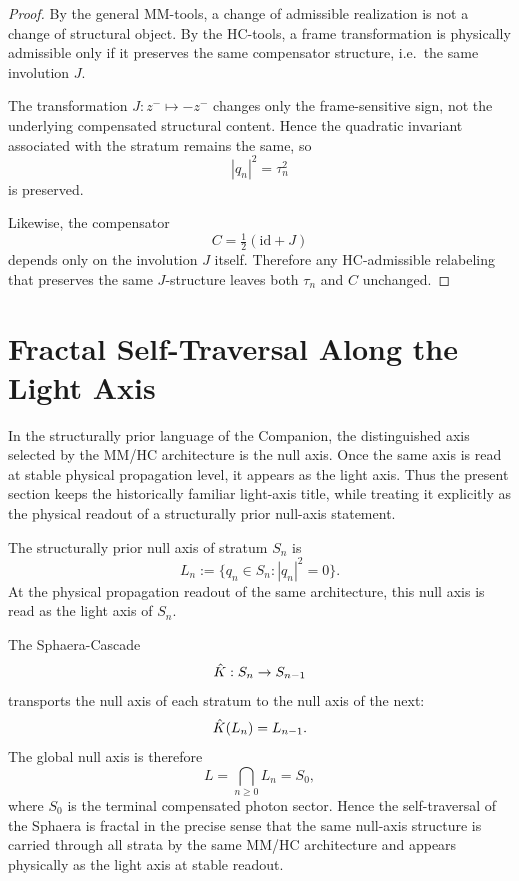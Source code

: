 \begin{proof}
By the general MM-tools, a change of admissible realization is not a
change of structural object.
By the HC-tools, a frame transformation is physically admissible only if
it preserves the same compensator structure, i.e.\ the same involution
$J$.

The transformation $J:z^-\mapsto -z^-$ changes only the frame-sensitive
sign, not the underlying compensated structural content.
Hence the quadratic invariant associated with the stratum remains the
same, so
\[
|q_n|^2=\tau_n^2
\]
is preserved.

Likewise, the compensator
\[
C=\tfrac12(\mathrm{id}+J)
\]
depends only on the involution $J$ itself.
Therefore any HC-admissible relabeling that preserves the same
$J$-structure leaves both $\tau_n$ and $C$ unchanged.
\end{proof}


\section{Fractal Self-Traversal Along the Light Axis}
\label{sec:fractal}

\begin{remark}
In the structurally prior language of the Companion, the distinguished
axis selected by the MM/HC architecture is the null axis. Once the same
axis is read at stable physical propagation level, it appears as the
light axis. Thus the present section keeps the historically familiar
light-axis title, while treating it explicitly as the physical readout
of a structurally prior null-axis statement.
\end{remark}

\begin{definition}
The structurally prior null axis of stratum $S_n$ is
\[
L_n:=\{q_n\in S_n:|q_n|^2=0\}.
\]
At the physical propagation readout of the same architecture, this null
axis is read as the light axis of $S_n$.
\end{definition}

\begin{theorem}\label{thm:fractal}
The Sphaera-Cascade
\[
\hat{K}:S_n\to S_{n-1}
\]
transports the null axis of each stratum to the null axis of the next:
\[
\hat{K}(L_n)=L_{n-1}.
\]
The global null axis is therefore
\[
L=\bigcap_{n\ge 0}L_n=S_0,
\]
where $S_0$ is the terminal compensated photon sector.
Hence the self-traversal of the Sphaera is fractal in the precise sense
that the same null-axis structure is carried through all strata by the
same MM/HC architecture and appears physically as the light axis at
stable readout.
\end{theorem}

